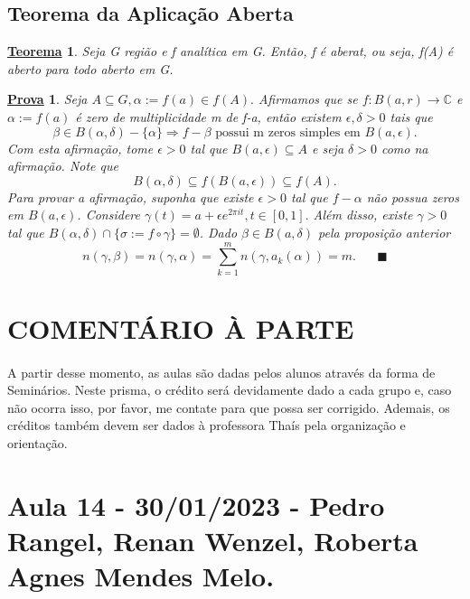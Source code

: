 \documentclass{article}
\newtheorem*{theorem*}{\underline{Teorema}}
\newtheorem*{proof*}{\underline{Prova}}
\renewcommand\qedsymbol{$\blacksquare$}
\begin{document}
\subsection{Teorema da Aplica\c c\~ao Aberta}
  \begin{theorem*}
    Seja G regi\~ao e f anal\'itica em G. Ent\~ao, f \'e aberat, ou seja, f(A) \'e aberto para todo aberto em G. 
  \end{theorem*}
 \begin{proof*}
   Seja $A\subseteq{G}, \alpha:=f(a)\in{f(A)}.$ Afirmamos que se $f:B(a, r)\rightarrow \mathbb{C}$ e $\alpha:=f(a)$ \'e zero de 
multiplicidade m de f-a, ent\~ao existem $\epsilon, \delta > 0$ tais que 
  $$
  \beta\in{B(\alpha, \delta)- \{\alpha\} }\Rightarrow f-\beta\text{ possui m zeros simples em }B(a, \epsilon).
  $$
  Com esta afirma\c c\~ao, tome $\epsilon > 0$ tal que $B(a, \epsilon)\subseteq{A}$ e seja $\delta > 0$ como na afirma\c c\~ao.
Note que
  $$
    B(\alpha, \delta)\subseteq{f(B(a, \epsilon))}\subseteq{f(A)}.
  $$
  Para provar a afirma\c c\~ao, suponha que existe $\epsilon > 0$ tal que $f - \alpha$ n\~ao possua zeros em $B(a, \epsilon)$. Considere
  $\gamma(t) = a + \epsilon e^{2\pi it}, t\in[0, 1].$ Al\'em disso, existe $\gamma > 0$ tal que $B(\alpha, \delta)\cap \{\sigma:=f\circ{\gamma}\}=\emptyset$.
  Dado $\beta\in{B(a, \delta)}$ pela proposi\c c\~ao anterior
  $$
  n(\gamma, \beta) = n(\gamma, \alpha) = \sum\limits_{k=1}^{m}n(\gamma, a_{k}(\alpha)) = m.\quad\text{ \qedsymbol}
  $$
 \end{proof*}
\newpage
\section{COMENT\'ARIO \`A PARTE}

\paragraph{}  A partir desse momento, as aulas s\~ao dadas pelos alunos atrav\'es da forma de Semin\'arios. Neste prisma, o cr\'edito ser\'a
devidamente dado a cada grupo e, caso n\~ao ocorra isso, por favor, me contate para que possa ser corrigido. Ademais, os cr\'editos
tamb\'em devem ser dados \`a professora Tha\'is pela organiza\c c\~ao e orienta\c c\~ao.
\newpage

\section{Aula 14 - 30/01/2023 - Pedro Rangel, Renan Wenzel, Roberta Agnes Mendes Melo.}
\end{document}
